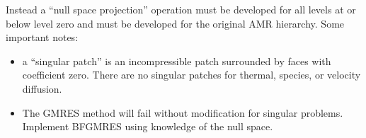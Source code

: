 Instead a ``null space projection'' operation must be developed
for all levels at or below level zero and must be developed for the
original AMR hierarchy.  Some important notes:
\begin{itemize}
\item a ``singular patch'' is an incompressible patch surrounded
  by faces with coefficient zero.   There are no singular patches
  for thermal, species, or velocity diffusion.
\item The GMRES method will fail without modification for singular problems.
 Implement BFGMRES using knowledge of the null space.
\end{itemize}




